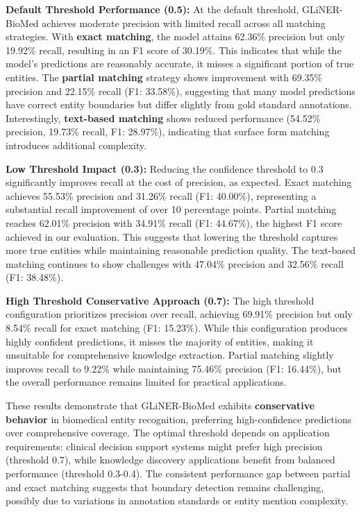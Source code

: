 \textbf{Default Threshold Performance (0.5):} At the default threshold, GLiNER-BioMed achieves moderate precision with limited recall across all matching strategies. With \textbf{exact matching}, the model attains 62.36\% precision but only 19.92\% recall, resulting in an F1 score of 30.19\%. This indicates that while the model's predictions are reasonably accurate, it misses a significant portion of true entities. The \textbf{partial matching} strategy shows improvement with 69.35\% precision and 22.15\% recall (F1: 33.58\%), suggesting that many model predictions have correct entity boundaries but differ slightly from gold standard annotations. Interestingly, \textbf{text-based matching} shows reduced performance (54.52\% precision, 19.73\% recall, F1: 28.97\%), indicating that surface form matching introduces additional complexity.

\textbf{Low Threshold Impact (0.3):} Reducing the confidence threshold to 0.3 significantly improves recall at the cost of precision, as expected. Exact matching achieves 55.53\% precision and 31.26\% recall (F1: 40.00\%), representing a substantial recall improvement of over 10 percentage points. Partial matching reaches 62.01\% precision with 34.91\% recall (F1: 44.67\%), the highest F1 score achieved in our evaluation. This suggests that lowering the threshold captures more true entities while maintaining reasonable prediction quality. The text-based matching continues to show challenges with 47.04\% precision and 32.56\% recall (F1: 38.48\%).

\textbf{High Threshold Conservative Approach (0.7):} The high threshold configuration prioritizes precision over recall, achieving 69.91\% precision but only 8.54\% recall for exact matching (F1: 15.23\%). While this configuration produces highly confident predictions, it misses the majority of entities, making it unsuitable for comprehensive knowledge extraction. Partial matching slightly improves recall to 9.22\% while maintaining 75.46\% precision (F1: 16.44\%), but the overall performance remains limited for practical applications.

These results demonstrate that GLiNER-BioMed exhibits \textbf{conservative behavior} in biomedical entity recognition, preferring high-confidence predictions over comprehensive coverage. The optimal threshold depends on application requirements: clinical decision support systems might prefer high precision (threshold 0.7), while knowledge discovery applications benefit from balanced performance (threshold 0.3-0.4). The consistent performance gap between partial and exact matching suggests that boundary detection remains challenging, possibly due to variations in annotation standards or entity mention complexity.

